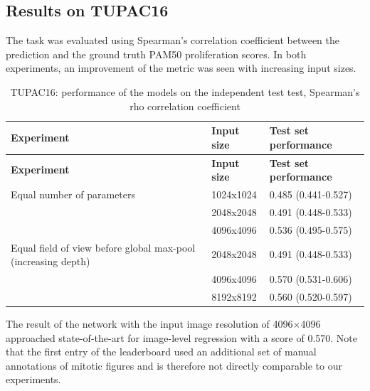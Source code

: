 \documentclass[
  12pt,
  a5,margin=2cmpaper,
]{article}
\begin{document}
\hypertarget{results-on-tupac16}{%
\subsection{Results on TUPAC16}\label{results-on-tupac16}}

The task was evaluated using Spearman's correlation coefficient between
the prediction and the ground truth PAM50 proliferation scores. In both
experiments, an improvement of the metric was seen with increasing input
sizes.

\hypertarget{tab:tupacresults}{}
\begin{longtable}[]{@{}lll@{}}
\caption{TUPAC16: performance of the models on the independent test
test, Spearman's rho correlation coefficient}\tabularnewline
\toprule\noalign{}
\textbf{Experiment} & \textbf{Input size} & \textbf{Test set
performance} \\
\midrule\noalign{}
\endfirsthead
\toprule\noalign{}
\textbf{Experiment} & \textbf{Input size} & \textbf{Test set
performance} \\
\midrule\noalign{}
\endhead
\bottomrule\noalign{}
\endlastfoot
Equal number of parameters & 1024x1024 & 0.485 (0.441-0.527) \\
& 2048x2048 & 0.491 (0.448-0.533) \\
& 4096x4096 & 0.536 (0.495-0.575) \\
Equal field of view before global max-pool (increasing depth) &
2048x2048 & 0.491 (0.448-0.533) \\
& 4096x4096 & 0.570 (0.531-0.606) \\
& 8192x8192 & 0.560 (0.520-0.597) \\
\end{longtable}

The result of the network with the input image resolution of
4096\(\times\)4096 approached state-of-the-art for image-level
regression with a score of 0.570. Note that the first entry of the
leaderboard used an additional set of manual annotations of mitotic
figures and is therefore not directly comparable to our experiments.
\end{document}
